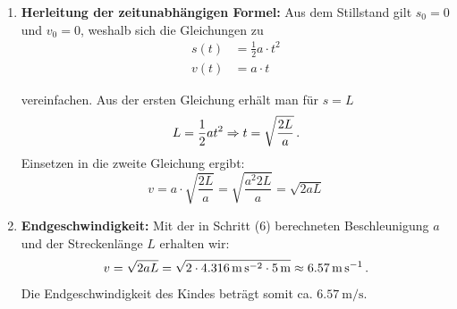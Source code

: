\documentclass[ngerman]{scrreprt}
\newenvironment{loesungbox}[1]
  {\needspace{5\baselineskip}\begin{loesungboxstyle}[frametitle={#1}]}
  {\end{loesungboxstyle}}
\begin{document}
\begin{loesungbox}{Lösung zu \Cref{aufg:rutsche}}
\begin{enumerate}
    \begin{equation}\label{eq: rutsche_fnet}
        F_{\text{netto}} = F_{G, \parallel} - F_{R, \text{Gleit}} = \SI{206.01}{\newton} - \SI{54.936}{\newton} = \SI{151.074}{\newton}
    \end{equation}
    Nach dem 2. Newtonschen Axiom ($F=ma$) ergibt sich die Beschleunigung:
    \begin{equation}\label{eq: rutsche_a}
        a = \frac{F_{\text{netto}}}{m} = \frac{\SI{151.074}{\newton}}{\SI{35}{\kg}} \approx \SI{4.316}{\metre\per\second\squared}
    \end{equation}
    \item \textbf{Herleitung der zeitunabhängigen Formel:} Aus dem Stillstand gilt $s_0 = 0$ und $v_0 = 0$, weshalb sich die Gleichungen zu 
    \begin{align}
        s(t) &= \frac{1}{2}a\cdot t^2 \\
        v(t) &= a\cdot t    
    \end{align}  
    
    vereinfachen. Aus der ersten Gleichung erhält man für $s = L$ 
    \begin{equation}
        L = \frac{1}{2}at^2 \Rightarrow t = \sqrt{\frac{2L}{a}} \,.
    \end{equation}
    Einsetzen in die zweite Gleichung ergibt:
    \begin{equation}\label{eq: rutsche_v_von_s}
        v = a \cdot \sqrt{\frac{2L}{a}} = \sqrt{\frac{a^2 2L}{a}} = \sqrt{2aL}
    \end{equation}
    \item \textbf{Endgeschwindigkeit:} Mit der in Schritt (6) berechneten Beschleunigung $a$ und der Streckenlänge $L$ erhalten wir:
    \begin{equation}\label{eq: rutsche_vend}
        v = \sqrt{2 a L} = \sqrt{2 \cdot \SI{4.316}{\m\per\s\squared} \cdot \SI{5}{\m}} \approx \SI{6.57}{\metre\per\second} \mDot
    \end{equation}
    Die Endgeschwindigkeit des Kindes beträgt somit ca. $\SI{6.57}{\metre\per\second}$.
\end{enumerate}
\end{loesungbox}
\end{document}
